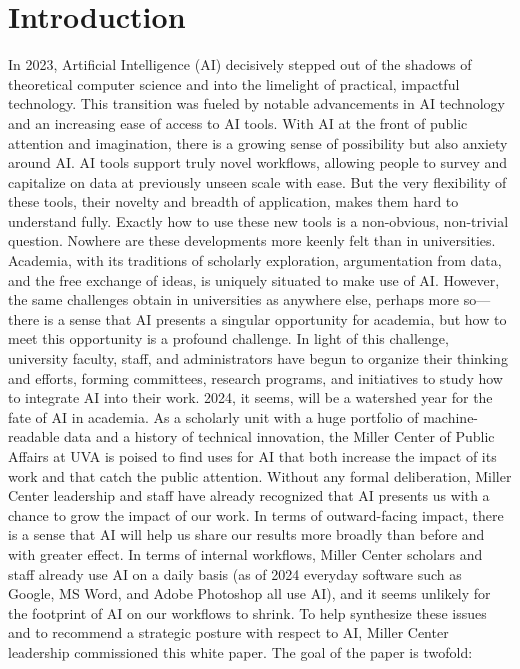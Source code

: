 \documentclass[11pt, oneside]{article}   	%
\begin{document}
\section{Introduction}\label{section.introduction}
In 2023, Artificial Intelligence (AI) decisively stepped out of the shadows of theoretical computer science and into the limelight of practical, impactful technology. This transition was fueled by notable advancements in AI technology and an increasing ease of access to AI tools.  With AI at the front of public attention and imagination, there is a growing sense of possibility but also anxiety around AI.  AI tools support truly novel workflows, allowing people to survey and capitalize on data at previously unseen scale with ease.  But the very flexibility of these tools, their novelty and breadth of application, makes them hard to understand fully.  Exactly how to use these new tools is a non-obvious, non-trivial question.
Nowhere are these developments more keenly felt than in universities.  Academia, with its traditions of scholarly exploration, argumentation from data, and the free exchange of ideas, is uniquely situated to make use of AI.  However, the same challenges obtain in universities as anywhere else, perhaps more so—there is a sense that AI presents a singular opportunity for academia, but how to meet this opportunity is a profound challenge.  In light of this challenge, university faculty, staff, and administrators have begun to organize their thinking and efforts, forming committees, research programs, and initiatives to study how to integrate AI into their work.  2024, it seems, will be a watershed year for the fate of AI in academia.
As a scholarly unit with a huge portfolio of machine-readable data and a history of technical innovation, the Miller Center of Public Affairs at UVA is poised to find uses for AI that both increase the impact of its work and that catch the public attention.   Without any formal deliberation, Miller Center leadership and staff have already recognized that AI presents us with a chance to grow the impact of our work.  In terms of outward-facing impact, there is a sense that AI will help us share our results more broadly than before and with greater effect.  In terms of internal workflows, Miller Center scholars and staff already use AI on a daily basis (as of 2024 everyday software such as Google, MS Word, and Adobe Photoshop all use AI), and it seems unlikely for the footprint of AI on our workflows to shrink.
To help synthesize these issues and to recommend a strategic posture with respect to AI, Miller Center leadership commissioned this white paper.  The goal of the paper is twofold:
\end{document}
